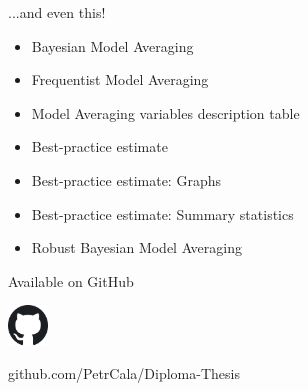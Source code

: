 \documentclass{beamer} %
\begin{document}
\begin{frame}{...and even this!}
    \begin{itemize}


        \item Bayesian Model Averaging
        \item Frequentist Model Averaging
        \item Model Averaging variables description table
        \item Best-practice estimate
        \item Best-practice estimate: Graphs
        \item Best-practice estimate: Summary statistics
        \item Robust Bayesian Model Averaging
    \end{itemize}
\end{frame}


\begin{frame}{Available on GitHub}

    \begin{center}
        \includegraphics[width=0.08\textwidth]{Figures/github.png}

        \vspace{0.5cm}

        \begin{Large}
            github.com/PetrCala/Diploma-Thesis \\
        \end{Large}

    \end{center}

\end{frame}
\end{document}

